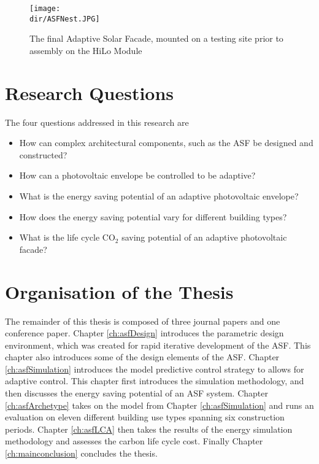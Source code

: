 \begin{figure}
\begin{center}
\texttt{[image: \\dir/ASFNest.JPG]}
\caption{The final Adaptive Solar Facade, mounted on a testing site prior to assembly on the HiLo Module}
\label{fig:ASFNest}
\end{center}
\end{figure}




\section{Research Questions}

The four questions addressed in this research are 

\begin{itemize}
\item How can complex architectural components, such as the ASF be designed and constructed? 
\item How can a photovoltaic envelope be controlled to be adaptive?
\item What is the energy saving potential of an adaptive photovoltaic envelope?
\item How does the energy saving potential vary for different building types?
\item What is the life cycle CO$_2$ saving potential of an adaptive photovoltaic facade?

\end{itemize}

\section{Organisation of the Thesis}

The remainder of this thesis is composed of three journal papers and one conference paper. Chapter \ref{ch:asfDesign} introduces the parametric design environment, which was created for rapid iterative development of the ASF. This chapter also introduces some of the design elements of the ASF. Chapter \ref{ch:asfSimulation} introduces the model predictive control strategy to allows for adaptive control. This chapter first introduces the simulation methodology, and then discusses the energy saving potential of an ASF system. Chapter \ref{ch:asfArchetype} takes on the model from Chapter \ref{ch:asfSimulation} and runs an evaluation on eleven different building use types spanning six construction periods. Chapter \ref{ch:asfLCA} then takes the results of the energy simulation methodology and assesses the carbon life cycle cost. Finally Chapter \ref{ch:mainconclusion} concludes the thesis. 